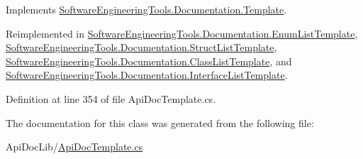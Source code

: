 Implements \hyperlink{class_software_engineering_tools_1_1_documentation_1_1_template_ab13b45a10b7eb65a0b6c15dbc1318664}{Software\+Engineering\+Tools.\+Documentation.\+Template}.



Reimplemented in \hyperlink{class_software_engineering_tools_1_1_documentation_1_1_enum_list_template_ab40ecbc15d3643dcd54cc7c4fdc7a42e}{Software\+Engineering\+Tools.\+Documentation.\+Enum\+List\+Template}, \hyperlink{class_software_engineering_tools_1_1_documentation_1_1_struct_list_template_ae89463eba79df4d331672e9774a65885}{Software\+Engineering\+Tools.\+Documentation.\+Struct\+List\+Template}, \hyperlink{class_software_engineering_tools_1_1_documentation_1_1_class_list_template_a310a651d73cc35f939bf302fd5233172}{Software\+Engineering\+Tools.\+Documentation.\+Class\+List\+Template}, and \hyperlink{class_software_engineering_tools_1_1_documentation_1_1_interface_list_template_a9c3f88c7e8e3444af953ccc3b926ee13}{Software\+Engineering\+Tools.\+Documentation.\+Interface\+List\+Template}.



Definition at line 354 of file Api\+Doc\+Template.\+cs.



The documentation for this class was generated from the following file\+:\begin{DoxyCompactItemize}
\item 
Api\+Doc\+Lib/\hyperlink{_api_doc_template_8cs}{Api\+Doc\+Template.\+cs}\end{DoxyCompactItemize}
